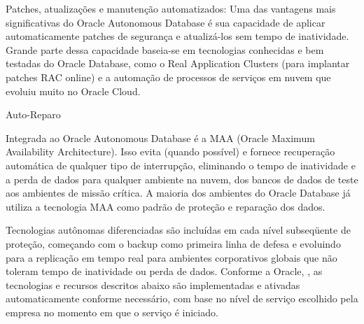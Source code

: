 \begin{alineas}
\item Patches, atualizações e manutenção automatizados: Uma das vantagens mais significativas do Oracle Autonomous Database é sua capacidade de aplicar automaticamente patches de segurança e atualizá-los sem tempo de inatividade. Grande parte dessa capacidade baseia-se em tecnologias conhecidas e bem testadas do Oracle Database, como o Real Application Clusters (para implantar patches RAC online) e a automação de processos de serviços em nuvem que evoluiu muito no Oracle Cloud.
\end{alineas}


Auto-Reparo


Integrada ao Oracle Autonomous Database é a MAA (Oracle Maximum Availability Architecture). Isso evita (quando possível) e fornece recuperação automática de qualquer tipo de interrupção, eliminando o tempo de inatividade e a perda de dados para qualquer ambiente na nuvem, dos bancos de dados de teste aos ambientes de missão crítica. A maioria dos ambientes do Oracle Database já utiliza a tecnologia MAA como padrão de proteção e reparação dos dados.

Tecnologias autônomas diferenciadas são incluídas em cada nível subseqüente de proteção, começando com o backup como primeira linha de defesa e evoluindo para a replicação em tempo real para ambientes corporativos globais que não toleram tempo de inatividade ou perda de dados. Conforme a Oracle, \cite{WPReparo}, as tecnologias e recursos descritos abaixo são implementadas e ativadas automaticamente conforme necessário, com base no nível de serviço escolhido pela empresa no momento em que o serviço é iniciado.

